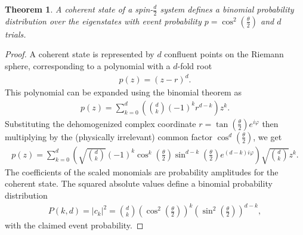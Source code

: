 \documentclass[12pt,final,3p]{elsarticle}
\newtheorem{theorem}{Theorem}
\begin{document}
\endgroup
\begin{theorem}
	A coherent state of a spin-$\frac{d}{2}$ system defines a binomial probability distribution over the eigenstates with event probability $p = \cos^{2}\left( \frac{\theta}{2} \right)$ and $d$ trials.
\end{theorem} 
\begin{proof}
	A coherent state is represented by $d$ confluent points on the Riemann sphere, corresponding to a polynomial with a $d$-fold root
	\begin{align}
	p(z) = (z-r)^{d}.
	\end{align}
	This polynomial can be expanded using the binomial theorem as
	\begin{align}
	p(z) = \sum_{k = 0}^{d}\left({d \choose k}(-1)^{k}r^{d-k}\right)z^{k}.
	\end{align}
	Substituting the dehomogenized complex coordinate $r = \tan{\left( \frac{\theta}{2}\right) }e^{i\varphi}$ then multiplying by the (physically irrelevant) common factor $\cos^{d}\left( \frac{\theta}{2}\right) $, we get
	\begin{align} p(z) = \sum_{k = 0}^{d}\left({\sqrt{d \choose k}}(-1)^{k}\cos^{k}\left(\frac{\theta}{2}\right)\sin^{d-k}\left(\frac{\theta}{2}\right)e^{(d-k)i\varphi}\right)\sqrt{d \choose k}z^{k}. \end{align}
	The coefficients of the scaled monomials are probability amplitudes for the coherent state. The squared absolute values define a binomial probability distribution
	\begin{align} P(k,d) = \left| c_{k} \right|^{2} = {d \choose k}\left(\cos^{2}{\left(\frac{\theta}{2}\right)}\right)^{k}\left(\sin^{2}{\left(\frac{\theta}{2}\right)}\right)^{d-k},\end{align}
	with the claimed event probability.
\end{proof}
\end{document}
